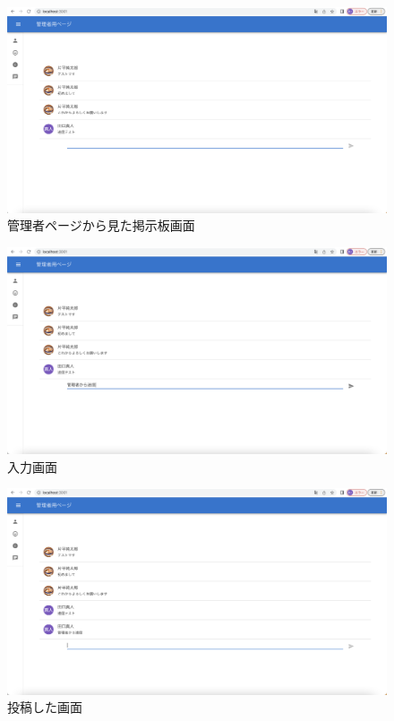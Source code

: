 \begin{figure}[!h]
  \begin{center}
    \includegraphics[scale=0.3, clip]{./img/sample16.png}
    \caption{管理者ページから見た掲示板画面}
    \label{fig:図の名前}
  \end{center}
  \end{figure}

  \begin{figure}[!h]
    \begin{center}
      \includegraphics[scale=0.3, clip]{./img/sample17.png}
      \caption{入力画面}
      \label{fig:図の名前}
    \end{center}
    \end{figure}

    \begin{figure}[!h]
      \begin{center}
        \includegraphics[scale=0.3, clip]{./img/sample18.png}
        \caption{投稿した画面}
        \label{fig:図の名前}
      \end{center}
      \end{figure}

